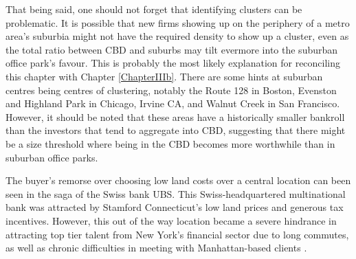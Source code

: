 That being said, one should not forget that identifying clusters can be problematic.  It is possible that new firms showing up on the periphery of a metro area's suburbia might not have the required density to show up a cluster, even as the total ratio between CBD and suburbs may tilt evermore into the suburban office park's favour.  This is probably the most likely explanation for reconciling this chapter with Chapter \ref{ChapterIIIb}.  There are some hints at suburban centres being centres of clustering, notably the Route 128 in Boston, Evenston and Highland Park in Chicago, Irvine CA, and Walnut Creek in San Francisco.  However, it should be noted that these areas have a historically smaller bankroll than the investors that tend to aggregate into CBD, suggesting that there might be a size threshold where being in the CBD becomes more worthwhile than in suburban office parks.  

The buyer's remorse over choosing low land costs over a central location can been seen in the saga of the Swiss bank UBS.  This Swiss-headquartered multinational bank was attracted by Stamford Connecticut's low land prices and generous tax incentives.  However, this out of the way location became a severe hindrance in attracting top tier talent from New York's financial sector due to long commutes, as well as chronic difficulties in meeting with Manhattan-based clients \citep{NYT_2011}.    
